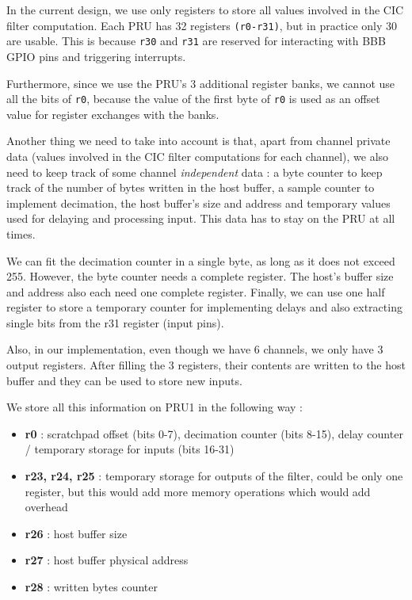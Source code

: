 \documentclass[]{report}
\providecommand{\tightlist}{%
	\setlength{\itemsep}{0pt}\setlength{\parskip}{0pt}}
\begin{document}
In the current design, we use only registers to store all values involved in the CIC filter computation. Each PRU has 32 registers \texttt{(r0-r31)}, but in practice only 30 are usable. This is because \texttt{r30} and \texttt{r31} are reserved for interacting with BBB GPIO pins and triggering interrupts.

Furthermore, since we use the PRU's 3 additional register banks, we cannot use all the bits of \texttt{r0}, because the value of the first byte of \texttt{r0} is used as an offset value for register exchanges with the banks.

Another thing we need to take into account is that, apart from channel private data (values involved in the CIC filter computations for each channel), we also need to keep track of some channel \textit{independent} data : a byte counter to keep track of the number of bytes written in the host buffer, a sample counter to implement decimation, the host buffer's size and address and temporary values used for delaying and processing input. This data has to stay on the PRU at all times.

We can fit the decimation counter in a single byte, as long as it does not exceed 255. However, the byte counter needs a complete register. The host's buffer size and address also each need one complete register. Finally, we can use one half register to store a temporary counter for implementing delays and also extracting single bits from the r31 register (input pins).

Also, in our implementation, even though we have 6 channels, we only have 3 output registers. After filling the 3 registers, their contents are written to the host buffer and they can be used to store new inputs.

We store all this information on PRU1 in the following way :

\begin{itemize}
\tightlist
\item
  \textbf{r0} : scratchpad offset (bits 0-7), decimation counter (bits
  8-15), delay counter / temporary storage for inputs (bits 16-31)
\item
  \textbf{r23, r24, r25} : temporary storage for outputs of the filter,
  could be only one register, but this would add more memory operations
  which would add overhead
\item
  \textbf{r26} : host buffer size
\item
  \textbf{r27} : host buffer physical address
\item
  \textbf{r28} : written bytes counter
\end{itemize}
\end{document}
